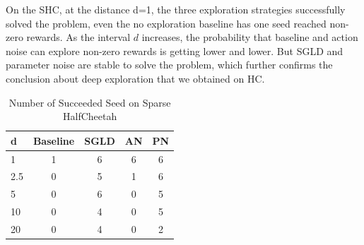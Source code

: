 On the SHC, at the distance d=1, the three exploration strategies successfully solved the problem, even the no exploration baseline has one seed reached non-zero rewards. As the interval $d$ increases, the probability that baseline and action noise can explore non-zero rewards is getting lower and lower. But SGLD and parameter noise are stable to solve the problem, which further confirms the conclusion about deep exploration that we obtained on HC.

\begin{table}[htbp]
   \caption{Number of Succeeded Seed on Sparse HalfCheetah}
   \label{tab:shc}
   \vskip 0.15in
   \begin{center}
   \begin{tabular}{lcccc}
   \toprule
       d    & Baseline & SGLD & AN & PN \\
   \midrule
      1     & 1        & 6    & 6  & 6 \\
      2.5   & 0        & 5    & 1  & 6 \\
      5     & 0        & 6    & 0  & 5 \\
      10    & 0        & 4    & 0  & 5 \\
      20    & 0        & 4    & 0  & 2 \\
   \bottomrule
   \end{tabular}
   \end{center}
   \vskip -0.1in
\end{table}

